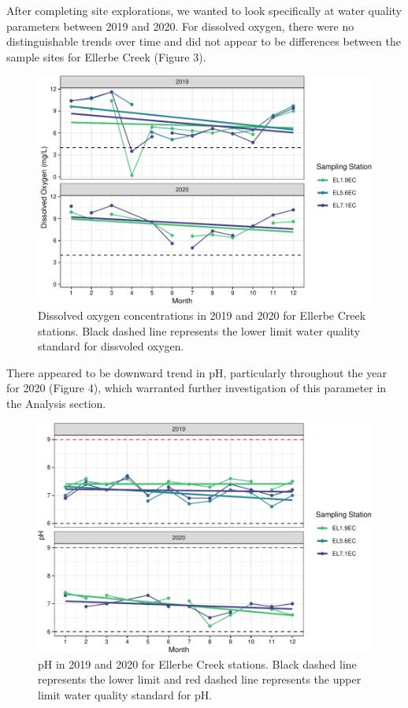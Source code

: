 \documentclass[
  12pt,
]{article}
\begin{document}
After completing site explorations, we wanted to look specifically at
water quality parameters between 2019 and 2020. For dissolved oxygen,
there were no distinguishable trends over time and did not appear to be
differences between the sample sites for Ellerbe Creek (Figure 3).

\begin{figure}
\centering
\includegraphics{August_Lindborg_ENV872_Project_files/figure-latex/unnamed-chunk-15-1.pdf}
\caption{Dissolved oxygen concentrations in 2019 and 2020 for Ellerbe
Creek stations. Black dashed line represents the lower limit water
quality standard for dissvoled oxygen.}
\end{figure}

There appeared to be downward trend in pH, particularly throughout the
year for 2020 (Figure 4), which warranted further investigation of this
parameter in the Analysis section.

\begin{figure}
\centering
\includegraphics{August_Lindborg_ENV872_Project_files/figure-latex/unnamed-chunk-16-1.pdf}
\caption{pH in 2019 and 2020 for Ellerbe Creek stations. Black dashed
line represents the lower limit and red dashed line represents the upper
limit water quality standard for pH.}
\end{figure}
\end{document}
